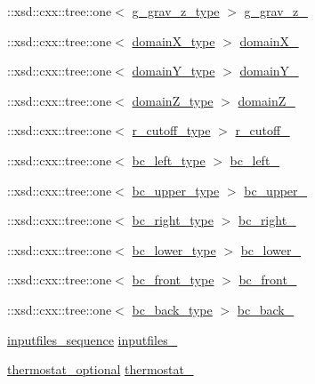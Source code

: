 \begin{DoxyCompactItemize}
\item 
\+::xsd\+::cxx\+::tree\+::one$<$ \hyperlink{classsetting__t_a2a9e06e642160debeeadb7a76b97c753}{g\+\_\+grav\+\_\+z\+\_\+type} $>$ \hyperlink{classsetting__t_a52a66734fe5e30d21e9a5efd6fdeb021}{g\+\_\+grav\+\_\+z\+\_\+}
\item 
\+::xsd\+::cxx\+::tree\+::one$<$ \hyperlink{classsetting__t_a1bf57fd62042e86d0e1e66f34fbaed31}{domain\+X\+\_\+type} $>$ \hyperlink{classsetting__t_a5bada1ac375ff0880996b3a260723a6d}{domain\+X\+\_\+}
\item 
\+::xsd\+::cxx\+::tree\+::one$<$ \hyperlink{classsetting__t_a9f13bfe9cc42660cf1e89cff4afe9435}{domain\+Y\+\_\+type} $>$ \hyperlink{classsetting__t_ac1925afc572245a536585b6cd0fb4be8}{domain\+Y\+\_\+}
\item 
\+::xsd\+::cxx\+::tree\+::one$<$ \hyperlink{classsetting__t_a2257367cc1475e2a9b1b2a82dbdaddaf}{domain\+Z\+\_\+type} $>$ \hyperlink{classsetting__t_a41da97081f66667b63f16613456805fb}{domain\+Z\+\_\+}
\item 
\+::xsd\+::cxx\+::tree\+::one$<$ \hyperlink{classsetting__t_ac5da16857addda387f3269e0a1a0cafa}{r\+\_\+cutoff\+\_\+type} $>$ \hyperlink{classsetting__t_abb5886ffed579461471d95037fc06d78}{r\+\_\+cutoff\+\_\+}
\item 
\+::xsd\+::cxx\+::tree\+::one$<$ \hyperlink{classsetting__t_a182532ef9d6146add054e0118af040f2}{bc\+\_\+left\+\_\+type} $>$ \hyperlink{classsetting__t_aa2093ad175216d5c95e16a0958d819ba}{bc\+\_\+left\+\_\+}
\item 
\+::xsd\+::cxx\+::tree\+::one$<$ \hyperlink{classsetting__t_abf5df957f10853c7b6a54a0073cd61fa}{bc\+\_\+upper\+\_\+type} $>$ \hyperlink{classsetting__t_a5819a5b67fe3860415c38c8ce232ddd8}{bc\+\_\+upper\+\_\+}
\item 
\+::xsd\+::cxx\+::tree\+::one$<$ \hyperlink{classsetting__t_a958fcc958aca728509db3a1f3756a0c9}{bc\+\_\+right\+\_\+type} $>$ \hyperlink{classsetting__t_ae5be1f5dc1c738e1c26fa59daadd3423}{bc\+\_\+right\+\_\+}
\item 
\+::xsd\+::cxx\+::tree\+::one$<$ \hyperlink{classsetting__t_a69864ad49075236ce00f2a73cdcbb13b}{bc\+\_\+lower\+\_\+type} $>$ \hyperlink{classsetting__t_af62d9775e1c9cd1be682bb44ea928659}{bc\+\_\+lower\+\_\+}
\item 
\+::xsd\+::cxx\+::tree\+::one$<$ \hyperlink{classsetting__t_a6010c9a9fc3ce2a4d583aa4bf07f650c}{bc\+\_\+front\+\_\+type} $>$ \hyperlink{classsetting__t_a5eb21e4b6b8071ff01cf13b307e1a4c2}{bc\+\_\+front\+\_\+}
\item 
\+::xsd\+::cxx\+::tree\+::one$<$ \hyperlink{classsetting__t_a5deb32969da7832b53abbf0564142627}{bc\+\_\+back\+\_\+type} $>$ \hyperlink{classsetting__t_ae3f783d90c1fa59f4dea76a3c044d9f2}{bc\+\_\+back\+\_\+}
\item 
\hyperlink{classsetting__t_a7f069827c89edb95e2b4347f1484b7b3}{inputfiles\+\_\+sequence} \hyperlink{classsetting__t_a18d57adb518ea816ed373630a8860fc1}{inputfiles\+\_\+}
\item 
\hyperlink{classsetting__t_a0e8b6cd8315d18962e1e25dea062eb1d}{thermostat\+\_\+optional} \hyperlink{classsetting__t_a77d5939fe7b2975b46345542df12911d}{thermostat\+\_\+}
\end{DoxyCompactItemize}


